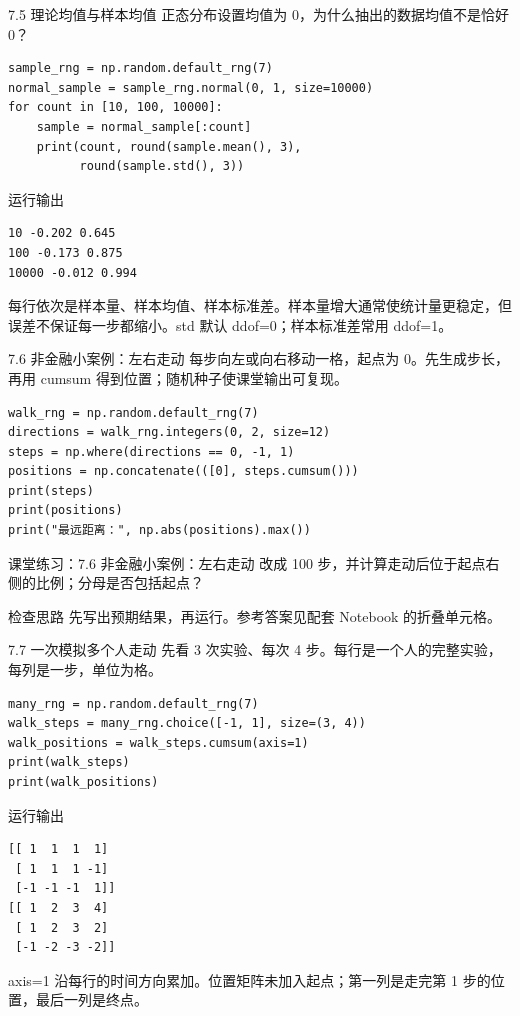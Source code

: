 \documentclass[9pt]{ctexbeamer}
\begin{document}
\begin{frame}[fragile]{7.5 理论均值与样本均值}
\small 正态分布设置均值为 0，为什么抽出的数据均值不是恰好 0？
\medskip
\begin{lstlisting}
sample_rng = np.random.default_rng(7)
normal_sample = sample_rng.normal(0, 1, size=10000)
for count in [10, 100, 10000]:
    sample = normal_sample[:count]
    print(count, round(sample.mean(), 3),
          round(sample.std(), 3))
\end{lstlisting}
\begin{exampleblock}{运行输出}
\begin{lstlisting}
10 -0.202 0.645
100 -0.173 0.875
10000 -0.012 0.994
\end{lstlisting}
\end{exampleblock}
\small 每行依次是样本量、样本均值、样本标准差。样本量增大通常使统计量更稳定，但误差不保证每一步都缩小。std 默认 ddof=0；样本标准差常用 ddof=1。
\end{frame}

\begin{frame}[fragile]{7.6 非金融小案例：左右走动}
\small 每步向左或向右移动一格，起点为 0。先生成步长，再用 cumsum 得到位置；随机种子使课堂输出可复现。
\medskip
\begin{lstlisting}
walk_rng = np.random.default_rng(7)
directions = walk_rng.integers(0, 2, size=12)
steps = np.where(directions == 0, -1, 1)
positions = np.concatenate(([0], steps.cumsum()))
print(steps)
print(positions)
print("最远距离：", np.abs(positions).max())
\end{lstlisting}
\end{frame}
\begin{frame}[fragile]{课堂练习：7.6 非金融小案例：左右走动}
改成 100 步，并计算走动后位于起点右侧的比例；分母是否包括起点？
\medskip
\begin{block}{检查思路}
先写出预期结果，再运行。参考答案见配套 Notebook 的折叠单元格。
\end{block}
\end{frame}

\begin{frame}[fragile]{7.7 一次模拟多个人走动}
\small 先看 3 次实验、每次 4 步。每行是一个人的完整实验，每列是一步，单位为格。
\medskip
\begin{lstlisting}
many_rng = np.random.default_rng(7)
walk_steps = many_rng.choice([-1, 1], size=(3, 4))
walk_positions = walk_steps.cumsum(axis=1)
print(walk_steps)
print(walk_positions)
\end{lstlisting}
\begin{exampleblock}{运行输出}
\begin{lstlisting}
[[ 1  1  1  1]
 [ 1  1  1 -1]
 [-1 -1 -1  1]]
[[ 1  2  3  4]
 [ 1  2  3  2]
 [-1 -2 -3 -2]]
\end{lstlisting}
\end{exampleblock}
\small axis=1 沿每行的时间方向累加。位置矩阵未加入起点；第一列是走完第 1 步的位置，最后一列是终点。
\end{frame}
\end{document}

